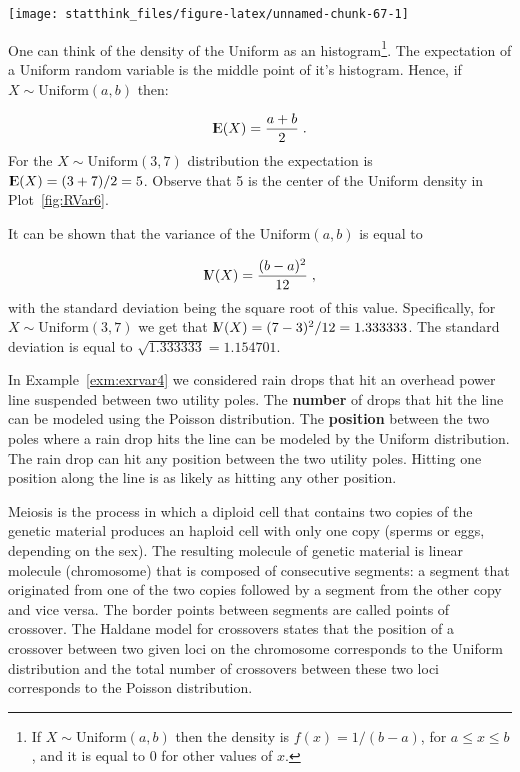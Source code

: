 \documentclass[]{krantz}
\newcommand{\Expec}{{\rm I\kern-.3em E}}
\newcommand{\Var}{{\rm I\kern-.3em V}}
\theoremstyle{definition}
\theoremstyle{definition}
\theoremstyle{definition}
\theoremstyle{remark}
\let\BeginKnitrBlock\begin \let\EndKnitrBlock\end
\begin{document}
\begin{center}\texttt{[image: statthink\_files/figure-latex/unnamed-chunk-67-1]} \end{center}

One can think of the density of the Uniform as an histogram\footnote{If \(X \sim \mathrm{Uniform}(a,b)\) then the density is
  \(f(x) = 1/(b-a)\), for \(a \leq x \leq b\), and it is equal to 0 for
  other values of \(x\).}. The
expectation of a Uniform random variable is the middle point of it's
histogram. Hence, if \(X \sim \mathrm{Uniform}(a,b)\) then:

\[\Expec(X) = \frac{a+b}{2}\;.\] For the \(X \sim \mathrm{Uniform}(3,7)\)
distribution the expectation is \(\Expec(X)= (3+7)/2 = 5\). Observe that 5
is the center of the Uniform density in Plot~\ref{fig:RVar6}.

It can be shown that the variance of the \(\mathrm{Uniform}(a,b)\) is
equal to

\[\Var(X) = \frac{(b-a)^2}{12}\;,\] with the standard deviation
being the square root of this value. Specifically, for
\(X \sim \mathrm{Uniform}(3,7)\) we get that
\(\Var(X) = (7-3)^2/12 = 1.333333\). The standard deviation is equal to
\(\sqrt{1.333333} = 1.154701\).

\BeginKnitrBlock{example}
\protect\hypertarget{exm:exrvar5}{}{\label{exm:exrvar5} }In Example~\ref{exm:exrvar4} we considered
rain drops that hit an overhead power line suspended between two utility
poles. The {\textbf{number}} of drops that hit the line can be modeled
using the Poisson distribution. The {\textbf{position}} between the two
poles where a rain drop hits the line can be modeled by the Uniform
distribution. The rain drop can hit any position between the two utility
poles. Hitting one position along the line is as likely as hitting any
other position.
\EndKnitrBlock{example}

\BeginKnitrBlock{example}
\protect\hypertarget{exm:exrvar6}{}{\label{exm:exrvar6} }Meiosis is the process in which a diploid cell
that contains two copies of the genetic material produces an haploid
cell with only one copy (sperms or eggs, depending on the sex). The
resulting molecule of genetic material is linear molecule (chromosome)
that is composed of consecutive segments: a segment that originated from
one of the two copies followed by a segment from the other copy and vice
versa. The border points between segments are called points of
crossover. The Haldane model for crossovers states that the position of
a crossover between two given loci on the chromosome corresponds to the
Uniform distribution and the total number of crossovers between these
two loci corresponds to the Poisson distribution.
\EndKnitrBlock{example}
\end{document}
